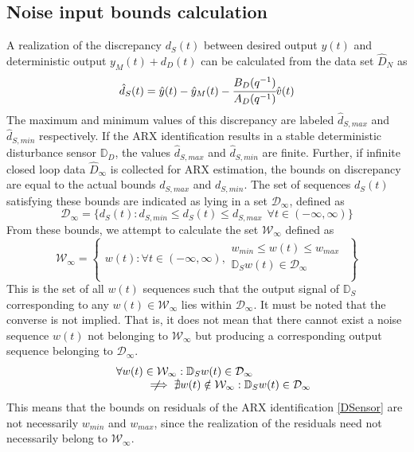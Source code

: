 \documentclass[letterpaper, 10 pt, conference]{ieeeconf}  %
\newcommand{\notimplies}{%
	\mathrel{{\ooalign{\hidewidth$\not\phantom{=}$\hidewidth\cr$\implies$}}}}
\begin{document}
\begin{enumerate}
	\subsection{Noise input bounds calculation}
	\label{Noise}
	A realization of the discrepancy $d_S(t)$ between desired output $y(t)$ and deterministic output $y_M(t)+d_D(t)$ can be calculated from the data set $\hat{D}_{N}$ as 
	\begin{equation*}
	\hat{d}_S(t) = \hat{y}(t)-\hat{y}_M(t)-\cfrac{B_D(q^{-1})}{A_D(q^{-1})} \hat{v}(t) 
	\end{equation*}
	The maximum and minimum values of this discrepancy are labeled $\hat{d}_{S,max}$ and $\hat{d}_{S,min}$ respectively. If the ARX identification results in a stable deterministic disturbance sensor $\mathbb{D}_D$, the values $\hat{d}_{S,max}$ and $\hat{d}_{S,min}$ are finite. Further, if infinite closed loop data $\hat{D}_{\infty}$ is collected for ARX estimation, the bounds on discrepancy are equal to the actual bounds $d_{S,max}$ and $d_{S,min}$. The set of sequences $d_S(t)$ satisfying these bounds are indicated as lying in a set $\mathcal{D}_{\infty}$, defined as 
	\begin{equation*}
	\mathcal{D}_{\infty} = \{d_S(t): d_{S,min} \leq d_S(t) \leq d_{S,max} \hspace{5pt} \forall t \in (-\infty,\infty) \}
	\end{equation*}
	 From these bounds, we attempt to calculate the set $\mathcal{W}_{\infty}$ defined as
	\begin{equation*}
	\mathcal{W}_{\infty} = \begin{Bmatrix} w(t): \forall t \in (-\infty,\infty), \begin{matrix}
	w_{min}\leq w(t)\leq w_{max} \\ 
	\mathbb{D}_S w(t) \in \mathcal{D}_{\infty} \\
	\end{matrix} 
	\end{Bmatrix}
	\end{equation*}  
	This is the set of all $w(t)$ sequences such that the output signal of $\mathbb{D}_S$ corresponding to any $w(t)\in \mathcal{W}_{\infty}$  lies within $\mathcal{D}_{\infty}$. It must be noted that the converse is not implied. That is, it does not mean that there cannot exist a noise sequence $w(t)$ not belonging to $\mathcal{W}_{\infty}$ but producing a corresponding output sequence belonging to $\mathcal{D}_{\infty}$.
	\begin{equation*}
	\begin{matrix}
	\hspace{-40pt}\forall w(t) \in \mathcal{W}_{\infty}  : \mathbb{D}_S w(t) \in \mathcal{D}_{\infty} \\
	\hspace{40pt}\notimplies \nexists  w(t) \notin \mathcal{W}_{\infty} : \mathbb{D}_S w(t) \in \mathcal{D}_{\infty}
	\end{matrix}
	\end{equation*}
	This means that the bounds on residuals of the ARX identification \eqref{DSensor} are not necessarily $w_{min}$ and $w_{max}$, since the realization of the residuals need not necessarily belong to $\mathcal{W}_{\infty}$. 
		

\end{enumerate}
\end{document}
